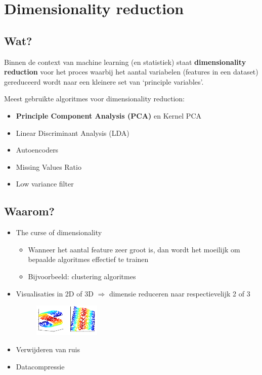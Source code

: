 \documentclass{article}
\begin{document}
\section{Dimensionality reduction}

\subsection{Wat?}

Binnen de context van machine learning (en statistiek) staat \textbf{dimensionality reduction} voor
het proces waarbij het aantal variabelen (features in een dataset) gereduceerd wordt naar een
kleinere set van `principle variables'.

Meest gebruikte algoritmes voor dimensionality reduction:

\begin{itemize}
    \item \textbf{Principle Component Analysis (PCA)} en Kernel PCA
    \item Linear Discriminant Analysis (LDA)
    \item Autoencoders
    \item Missing Values Ratio
    \item Low variance filter
\end{itemize}

\subsection{Waarom?}

\begin{itemize}
    \item The curse of dimensionality
    \begin{itemize}
        \item Wanneer het aantal feature zeer groot is, dan wordt het moeilijk om bepaalde algoritmes effectief te trainen
        \item Bijvoorbeeld: clustering algoritmes
    \end{itemize}
    \item Visualisaties in 2D of 3D $\Rightarrow$ dimensie reduceren naar respectievelijk 2 of 3
    \begin{figure}[H]
        \centering
        \includegraphics[width=0.3\textwidth]{dim-reduction-2d-3d.png}
    \end{figure}
    
    \item Verwijderen van ruis
    \item Datacompressie
\end{itemize}
\end{document}
